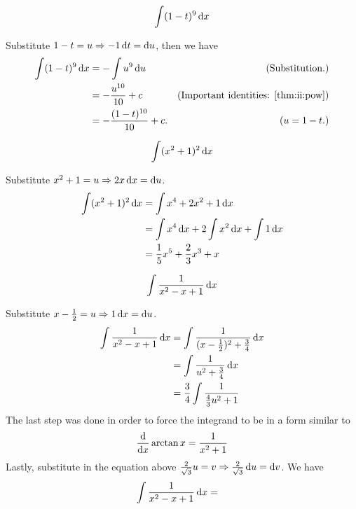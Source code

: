 \begin{question}
    \begin{align}
        \int (1 - t)^9 \mathop{}\!\mathrm{d} x
    \end{align}
\end{question}
\begin{solution}
    Substitute \(1 - t = u \Rightarrow -1 \mathop{}\!\mathrm{d} t = \mathop{}\!\mathrm{d} u\), then we have
    \begin{align}
        \int (1 - t)^9 \mathop{}\!\mathrm{d} x &= - \int u^9 \mathop{}\!\mathrm{d} u & \text{(Substitution.)}\\
        &= -\frac{u ^{10}}{10} + c & \text{(Important identities: \ref{thm:ii:pow})} \\
        &= -\frac{(1 - t)^{10}}{10} + c \text{.} & \text{(\(u = 1 - t\).)}
    \end{align}
\end{solution}
\begin{question}
    \begin{align}
        \int (x^2 + 1)^2 \mathop{}\!\mathrm{d} x
    \end{align}
\end{question}
\begin{solution}
    Substitute \(x^2 + 1 = u \Rightarrow 2x \mathop{}\!\mathrm{d} x = \mathop{}\!\mathrm{d} u\).
    \begin{align}
        \int (x^2 + 1)^2 \mathop{}\!\mathrm{d} x &= \int x^4 + 2x^2 + 1 \mathop{}\!\mathrm{d} x \\
        &= \int x^4 \mathop{}\!\mathrm{d} x + 2 \int x^2 \mathop{}\!\mathrm{d} x + \int 1 \mathop{}\!\mathrm{d} x \\
        &= \frac{1}{5} x^5 + \frac{2}{3} x^3 + x
    \end{align}
\end{solution}
\begin{question}
    \begin{align}
        \int \frac{1}{x^2 -x + 1} \mathop{}\!\mathrm{d} x
    \end{align}
\end{question}
\begin{solution}
    Substitute \(x - \frac{1}{2} = u \Rightarrow 1 \mathop{}\!\mathrm{d} x = \mathop{}\!\mathrm{d} u\).
    \begin{align}
        \int \frac{1}{x^2 -x + 1} \mathop{}\!\mathrm{d} x &= \int \frac{1}{(x - \frac{1}{2})^2 + \frac{3}{4}} \mathop{}\!\mathrm{d} x\\
        &= \int \frac{1}{u^2 + \frac{3}{4}} \mathop{}\!\mathrm{d} x \\
        &= \frac{3}{4} \int \frac{1}{\frac{4}{3} u^2 + 1}
    \end{align}
    The last step was done in order to force the integrand to be in a form similar to
    \begin{align}
        \frac{\mathop{}\!\mathrm{d}}{\mathop{}\!\mathrm{d} x} \arctan x = \frac{1}{x^2 + 1}
    \end{align}
    Lastly, substitute in the equation above \(\frac{2}{\sqrt{3}} u = v \Rightarrow \frac{2}{\sqrt{3}} \mathop{}\!\mathrm{d} u = \mathop{}\!\mathrm{d} v\). We have
    \begin{align}
        \int \frac{1}{x^2 -x + 1} \mathop{}\!\mathrm{d} x &= 
    \end{align}
\end{solution}